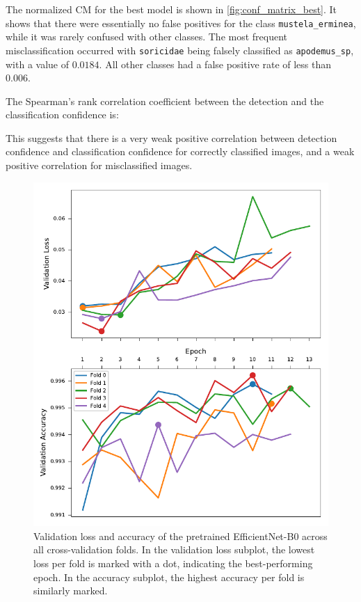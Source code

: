 The normalized \ac{CM} for the best model is shown in \autoref{fig:conf_matrix_best}.
It shows that there were essentially no false positives for the class \texttt{mustela\_erminea}, while it was rarely confused with other classes.
The most frequent misclassification occurred with \texttt{soricidae} being falsely classified as \texttt{apodemus\_sp}, with a value of \(0.0184\).
All other classes had a false positive rate of less than \(0.006\).

The Spearman's rank correlation coefficient between the detection and the classification confidence is:



This suggests that there is a very weak positive correlation between detection confidence and classification confidence for correctly classified images, and a weak positive correlation for misclassified images.

\begin{figure}[ht]
\centering
\includegraphics{figures/training_metrics_best_model.pdf}
\caption{
    Validation loss and accuracy of the pretrained EfficientNet-B0 across all cross-validation folds. 
    In the validation loss subplot, the lowest loss per fold is marked with a dot, indicating the best-performing epoch. 
    In the accuracy subplot, the highest accuracy per fold is similarly marked.
    }
\label{fig:training_metrics_best_model}
\end{figure}


